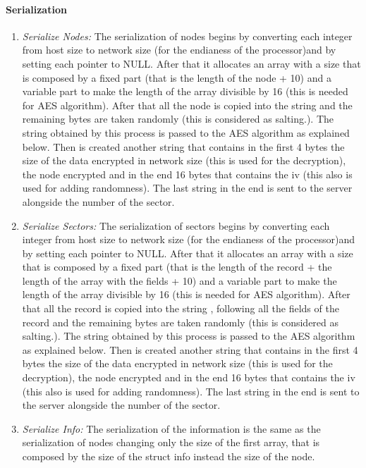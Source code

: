 \paragraph{Serialization}
\begin{enumerate}
\item \emph{Serialize Nodes:} The serialization of nodes begins by converting each integer from host size to network size (for the endianess of the processor)and by setting each pointer to NULL. After that it allocates an array with a size that is composed by a fixed part (that is the length of the node + 10) and a variable part to make the length of the array divisible by 16 (this is needed for AES algorithm). After that all the node is copied into the string and the remaining bytes are taken randomly (this is considered as salting.). The string obtained by this process is passed to the AES algorithm as explained below. Then is created another string that contains in the first 4 bytes the size of the data encrypted in network size (this is used for the decryption), the node encrypted and in the end 16 bytes that contains the iv (this also is used for adding randomness). The last string in the end is sent to the server alongside the number of the sector. 
\item \emph{Serialize Sectors:} The serialization of sectors begins by converting each integer from host size to network size (for the endianess of the processor)and by setting each pointer to NULL. After that it allocates an array with a size that is composed by a fixed part (that is the length of the record + the length of the array with the fields + 10) and a variable part to make the length of the array divisible by 16 (this is needed for AES algorithm). After that all the record is copied into the string , following all the fields of the record and the remaining bytes are taken randomly (this is considered as salting.). The string obtained by this process is passed to the AES algorithm as explained below. Then is created another string that contains in the first 4 bytes the size of the data encrypted in network size (this is used for the decryption), the node encrypted and in the end 16 bytes that contains the iv (this also is used for adding randomness). The last string in the end is sent to the server alongside the number of the sector. 
\item \emph{Serialize Info:} The serialization of the information is the same as the serialization of nodes changing only the size of the first array, that is composed by the size of the struct info instead the size of the node.
\end{enumerate}

